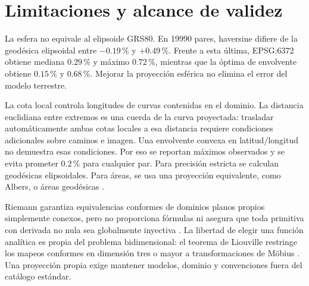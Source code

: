 \section{Limitaciones y alcance de validez}
La esfera no equivale al elipsoide GRS80. En 19990 pares, haversine difiere de la geodésica elipsoidal entre $-0.19\,\%$ y $+0.49\,\%$. Frente a esta última, EPSG:6372 obtiene mediana $0.29\,\%$ y máximo $0.72\,\%$, mientras que la óptima de envolvente obtiene $0.15\,\%$ y $0.68\,\%$. Mejorar la proyección esférica no elimina el error del modelo terrestre.

La cota local controla longitudes de curvas contenidas en el dominio. La distancia euclidiana entre extremos es una cuerda de la curva proyectada: trasladar automáticamente ambas cotas locales a esa distancia requiere condiciones adicionales sobre caminos e imagen. Una envolvente convexa en latitud/longitud no demuestra esas condiciones. Por eso se reportan máximos observados y se evita prometer $0.2\,\%$ para cualquier par. Para precisión estricta se calculan geodésicas elipsoidales. Para áreas, se usa una proyección equivalente, como Albers, o áreas geodésicas \cite{snyder1987}.

Riemann garantiza equivalencias conformes de dominios planos propios simplemente conexos, pero no proporciona fórmulas ni asegura que toda primitiva con derivada no nula sea globalmente inyectiva \cite{ahlfors1979}. La libertad de elegir una función analítica es propia del problema bidimensional: el teorema de Liouville restringe los mapeos conformes en dimensión tres o mayor a transformaciones de Möbius \cite{blair2000}. Una proyección propia exige mantener modelos, dominio y convenciones fuera del catálogo estándar.
